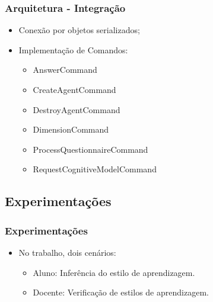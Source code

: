 \documentclass{beamer}
\begin{document}
\begin{frame}
    \frametitle{Arquitetura - Integração}
    \begin{itemize}
	\item Conexão por objetos serializados;
	\item Implementação de Comandos:
	\begin{itemize}
        	\item AnswerCommand
        	\item CreateAgentCommand
        	\item DestroyAgentCommand
        	\item DimensionCommand
        	\item ProcessQuestionnaireCommand
        	\item RequestCognitiveModelCommand
	\end{itemize}
    \end{itemize}
\end{frame}

\subsection{Experimentações}
\begin{frame}
    \frametitle{Experimentações}
    \begin{itemize}
        \item No trabalho, dois cenários:
	\begin{itemize}
		\item Aluno: Inferência do estilo de aprendizagem.
		\item Docente: Verificação de estilos de aprendizagem.
	\end{itemize}
    \end{itemize}
\end{frame}
\end{document}
